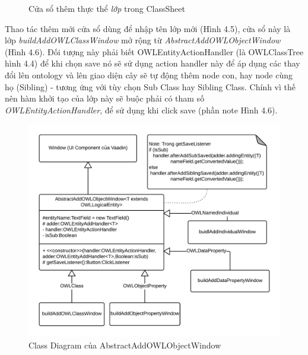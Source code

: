 \begin{figure}[h!]
	\centering
	\caption{Cửa sổ thêm thực thể \textit{lớp} trong ClassSheet \label{overflow}}
\end{figure}
Thao tác thêm mới cửa sổ dùng để nhập tên lớp mới (Hình 4.5), cửa sổ này là lớp \textit{buildAddOWLClassWindow} mở rộng từ \textit{AbstractAddOWLObjectWindow} (Hình 4.6). Đối tượng này phải biết OWLEntityActionHandler (là OWLClassTree hình 4.4) để khi chọn save nó sẽ sử dụng action handler này để áp dụng các thay đổi lên ontology và lên giao diện cây sẽ tự động thêm node con, hay node cùng họ (Sibling) - tương ứng với tùy chọn Sub Class hay Sibling Class. Chính vì thế nên hàm khởi tạo của lớp này sẽ buộc phải có tham số \textit{OWLEntityActionHandler}, để sử dụng khi click save (phần note Hình 4.6).
\begin{figure}[h!]
	\centering
	\includegraphics[width=155mm]{Figures/uml_addowlobjectwindow.png}
	\caption{Class Diagram của  AbstractAddOWLObjectWindow\label{overflow}}
\end{figure}
